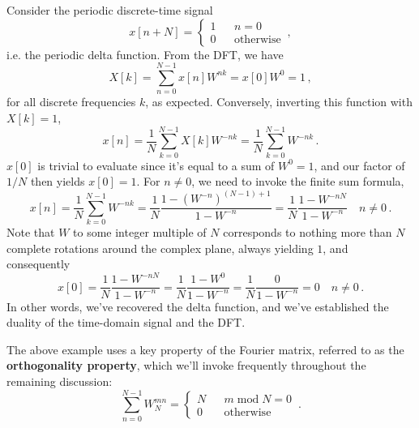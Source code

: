 \begin{exmp}
  Consider the periodic discrete-time signal
  \begin{displaymath}
    x[n + N] = \left\{\begin{array}{ccl}
      1 & & n = 0 \\
      0 & & \mathrm{otherwise}
    \end{array}\right. \,,
  \end{displaymath}
  i.e. the periodic delta function. From the DFT, we have
  \begin{displaymath}
    X[k] = \sum_{n=0}^{N-1}x[n] W^{nk} = x[0]W^0 = 1 \,,
  \end{displaymath}
  for all discrete frequencies $k$, as expected. Conversely, inverting this
  function with $X[k] = 1$,
  \begin{displaymath}
    x[n] = \frac{1}{N}\sum_{k=0}^{N-1}X[k] W^{-nk}
    = \frac{1}{N}\sum_{k=0}^{N-1}W^{-nk} \,.
  \end{displaymath}
  $x[0]$ is trivial to evaluate since it's equal to a sum of $W^0 = 1$,
  and our factor of $1/N$ then yields $x[0] = 1$. For $n\neq 0$, we need to
  invoke the finite sum formula,
  \begin{displaymath}
    x[n] = \frac{1}{N}\sum_{k=0}^{N-1}W^{-nk}
    = \frac{1}{N}\frac{1-\left(W^{-n}\right)^{(N-1)+1}}{1 - W^{-n}}
    = \frac{1}{N}\frac{1-W^{-nN}}{1 - W^{-n}} \quad n\neq 0 \,.
  \end{displaymath}
  Note that $W$ to some integer multiple of $N$ corresponds to nothing more
  than $N$ complete rotations around the complex plane, always yielding $1$,
  and consequently
  \begin{displaymath}
    x[0] = \frac{1}{N}\frac{1-W^{-nN}}{1 - W^{-n}}
    = \frac{1}{N}\frac{1-W^0}{1 - W^{-n}}
    = \frac{1}{N}\frac{0}{1 - W^{-n}} = 0 \quad n\neq 0 \,.
  \end{displaymath}
  In other words, we've recovered the delta function, and we've established
  the duality of the time-domain signal and the DFT.
\end{exmp}
%
The above example uses a key property of the Fourier matrix, referred to
as the \textbf{orthogonality property}, which we'll invoke frequently
throughout the remaining discussion:
%
\begin{equation}
  \sum_{n=0}^{N-1}W_N^{mn} = \left\{\begin{array}{ccl}
    N & & m\;\mathrm{mod}\;N = 0 \\
    0 & & \mathrm{otherwise} 
  \end{array}\right. \,.
\end{equation}
